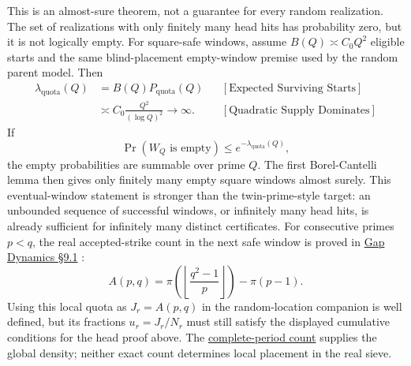 This is an almost-sure theorem, not a guarantee for every random realization. The set of realizations with only finitely many head hits has probability zero, but it is not logically empty.
For square-safe windows, assume $B(Q)\asymp C_0Q^2$ eligible starts and the same blind-placement empty-window premise used by the random parent model. Then
\begin{equation*}
\begin{aligned}
\lambda_{\mathrm{quota}}(Q)
&=B(Q)P_{\mathrm{quota}}(Q)
&&[\text{Expected Surviving Starts}]\\
&\asymp
C_0\frac{Q^2}{(\log Q)^2}
\longrightarrow\infty.
&&[\text{Quadratic Supply Dominates}]
\end{aligned}
\end{equation*}
If
\begin{equation*}
\Pr(W_Q\text{ is empty})
\le e^{-\lambda_{\mathrm{quota}}(Q)},
\end{equation*}
the empty probabilities are summable over prime $Q$. The first Borel-Cantelli lemma then gives only finitely many empty square windows almost surely. This eventual-window statement is stronger than the twin-prime-style target: an unbounded sequence of successful windows, or infinitely many head hits, is already sufficient for infinitely many distinct certificates.
For consecutive primes $p < q$, the real accepted-strike count in the next safe window is proved in \href{https://github.com/thiagomata/prime-numbers/blob/master/articles/chapter6/gap-dynamics.md#91-exact-accepted-strikes}{Gap Dynamics \S{}9.1} \cite{gapdynamics2026}:
\begin{equation*}
A(p,q)
=
\pi\left(\left\lfloor\frac{q^2-1}{p}\right\rfloor\right)
-\pi(p-1).
\end{equation*}
Using this local quota as $J_r=A(p,q)$ in the random-location companion is well defined, but its fractions $u_r=J_r/N_r$ must still satisfy the displayed cumulative conditions for the head proof above. The \href{https://github.com/thiagomata/prime-numbers/blob/master/articles/chapter6/gap-dynamics.md#52-exact-non-recursive-global-count}{complete-period count} \cite{gapdynamics2026} supplies the global density; neither exact count determines local placement in the real sieve.
